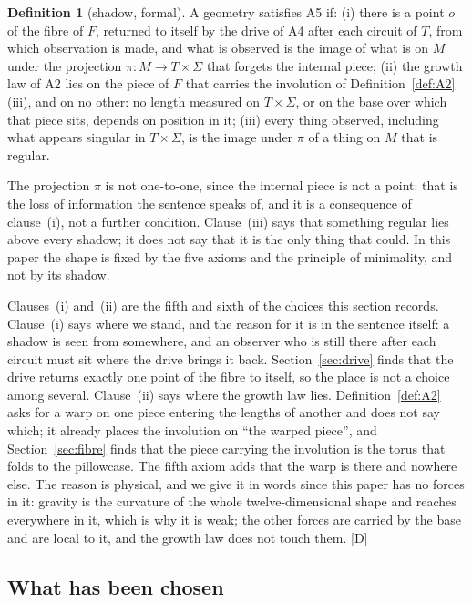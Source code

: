 \documentclass[11pt,a4paper]{article}
\theoremstyle{plain}
\theoremstyle{definition}
\newtheorem{definition}[theorem]{Definition}
\theoremstyle{remark}
\newcommand{\rigD}{[\textup{D}]}
\begin{document}
\begin{definition}[shadow, formal]\label{def:A5}
A geometry satisfies A5 if: (i) there is a point $o$ of the fibre of $F$, returned to itself by the drive of A4 after each circuit of $T$, from which observation is made, and what is observed is the image of what is on $M$ under the projection $\pi\colon M\to T\times\Sigma$ that forgets the internal piece; (ii) the growth law of A2 lies on the piece of $F$ that carries the involution of Definition~\ref{def:A2}(iii), and on no other: no length measured on $T\times\Sigma$, or on the base over which that piece sits, depends on position in it; (iii) every thing observed, including what appears singular in $T\times\Sigma$, is the image under $\pi$ of a thing on $M$ that is regular.
\end{definition}

The projection $\pi$ is not one-to-one, since the internal piece is not a point: that is the loss of information the sentence speaks of, and it is a consequence of clause~(i), not a further condition. Clause~(iii) says that something regular lies above every shadow; it does not say that it is the only thing that could. In this paper the shape is fixed by the five axioms and the principle of minimality, and not by its shadow.

Clauses~(i) and~(ii) are the fifth and sixth of the choices this section records. Clause~(i) says where we stand, and the reason for it is in the sentence itself: a shadow is seen from somewhere, and an observer who is still there after each circuit must sit where the drive brings it back. Section~\ref{sec:drive} finds that the drive returns exactly one point of the fibre to itself, so the place is not a choice among several. Clause~(ii) says where the growth law lies. Definition~\ref{def:A2} asks for a warp on one piece entering the lengths of another and does not say which; it already places the involution on ``the warped piece'', and Section~\ref{sec:fibre} finds that the piece carrying the involution is the torus that folds to the pillowcase. The fifth axiom adds that the warp is there and nowhere else. The reason is physical, and we give it in words since this paper has no forces in it: gravity is the curvature of the whole twelve-dimensional shape and reaches everywhere in it, which is why it is weak; the other forces are carried by the base and are local to it, and the growth law does not touch them. \rigD

\subsection{What has been chosen}\label{sec:scope}
\end{document}
